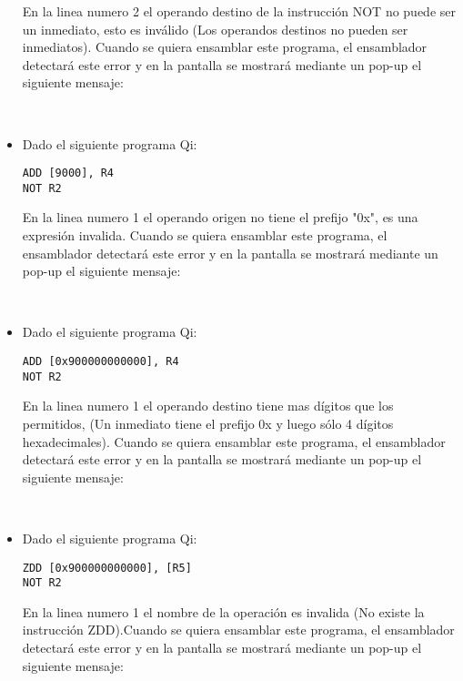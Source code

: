 \begin{itemize}
En la linea numero 2 el operando destino de la instrucción NOT no puede ser un inmediato, esto es inválido (Los operandos destinos no pueden ser inmediatos). Cuando se quiera ensamblar este programa, el ensamblador detectará este error y en la pantalla se mostrará mediante un pop-up el siguiente mensaje:

 \\ 

\item Dado el siguiente programa Qi:

\begin{verbatim}
ADD [9000], R4
NOT R2
\end{verbatim}

En la linea numero 1 el operando origen no tiene el prefijo "0x", es una expresión invalida. Cuando se quiera ensamblar este programa, el ensamblador detectará este error y en la pantalla se mostrará mediante un pop-up el siguiente mensaje:

 \\ 

\item Dado el siguiente programa Qi:

\begin{verbatim}
ADD [0x900000000000], R4
NOT R2
\end{verbatim}

En la linea numero 1 el operando destino tiene mas dígitos que los permitidos, (Un inmediato tiene el prefijo 0x y luego sólo 4 dígitos hexadecimales). Cuando se quiera ensamblar este programa, el ensamblador detectará este error y en la pantalla se mostrará mediante un pop-up el siguiente mensaje:

 \\ 

\item Dado el siguiente programa Qi:

\begin{verbatim}
ZDD [0x900000000000], [R5]
NOT R2
\end{verbatim}

En la linea numero 1 el nombre de la operación es invalida (No existe la instrucción ZDD).Cuando se quiera ensamblar este programa, el ensamblador detectará este error y en la pantalla se mostrará mediante un pop-up el siguiente mensaje:


\end{itemize}
